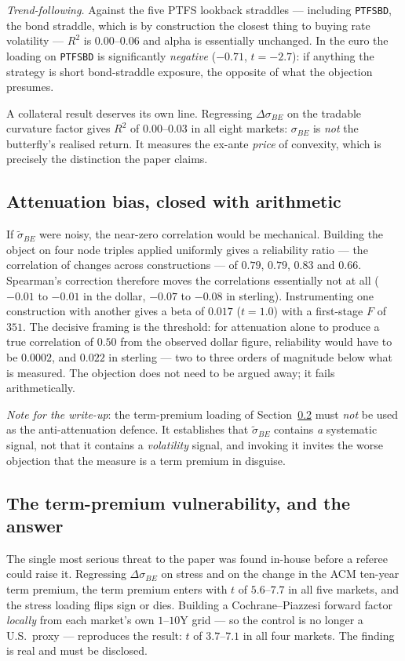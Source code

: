 \documentclass[11pt]{article}
\newcommand{\sBE}{\sigma_{BE}}
\begin{document}
\emph{Trend-following.} Against the five \citet{fh2001} PTFS lookback straddles --- including
\texttt{PTFSBD}, the bond straddle, which is by construction the closest thing to buying rate
volatility --- $R^2$ is $0.00$--$0.06$ and alpha is essentially unchanged. In the euro the loading on
\texttt{PTFSBD} is significantly \emph{negative} ($-0.71$, $t=-2.7$): if anything the strategy is short
bond-straddle exposure, the opposite of what the objection presumes.

A collateral result deserves its own line. Regressing $\Delta\sBE$ on the tradable curvature factor
gives $R^2$ of $0.00$--$0.03$ in all eight markets: $\sBE$ is \emph{not} the butterfly's realised
return. It measures the ex-ante \emph{price} of convexity, which is precisely the distinction the paper
claims.

\subsection{Attenuation bias, closed with arithmetic}\label{sec:atten}
If $\tilde\sigma_{BE}$ were noisy, the near-zero correlation would be mechanical. Building the object
on four node triples applied uniformly gives a reliability ratio --- the correlation of changes
across constructions --- of $0.79$, $0.79$, $0.83$ and $0.66$. Spearman's correction therefore moves
the correlations essentially not at all ($-0.01$ to $-0.01$ in the dollar, $-0.07$ to $-0.08$ in
sterling). Instrumenting one construction with another gives a beta of $0.017$ ($t=1.0$) with a
first-stage $F$ of $351$. The decisive framing is the threshold: for attenuation alone to produce a
true correlation of $0.50$ from the observed dollar figure, reliability would have to be $0.0002$,
and $0.022$ in sterling --- two to three orders of magnitude below what is measured. The objection
does not need to be argued away; it fails arithmetically.

\emph{Note for the write-up}: the term-premium loading of Section~\ref{sec:termpremium} must
\emph{not} be used as the anti-attenuation defence. It establishes that $\tilde\sigma_{BE}$ contains
\emph{a} systematic signal, not that it contains a \emph{volatility} signal, and invoking it invites
the worse objection that the measure is a term premium in disguise.

\subsection{The term-premium vulnerability, and the answer}\label{sec:termpremium}
The single most serious threat to the paper was found in-house before a referee could raise it.
Regressing $\Delta\sBE$ on stress and on the change in the ACM ten-year term premium, the term premium
enters with $t$ of $5.6$--$7.7$ in all five markets, and the stress loading flips sign or dies. Building
a Cochrane--Piazzesi forward factor \emph{locally} from each market's own $1$--$10$Y grid --- so the
control is no longer a U.S.\ proxy --- reproduces the result: $t$ of $3.7$--$7.1$ in all four markets.
The finding is real and must be disclosed.
\end{document}
